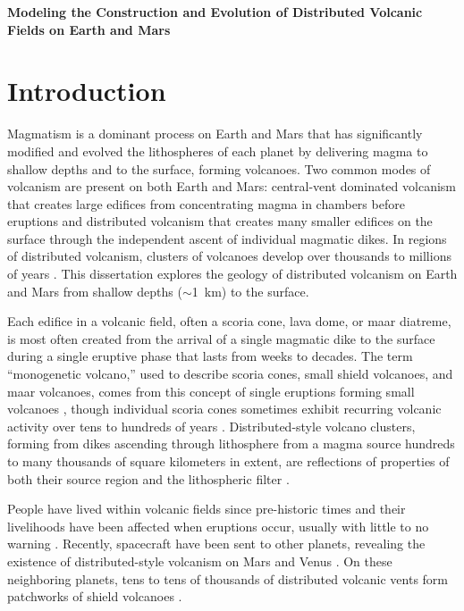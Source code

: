 \begin{center}
\textbf{Modeling the Construction and Evolution of Distributed Volcanic Fields on Earth and Mars}
\end{center}

\section*{Introduction}
Magmatism is a dominant process on Earth and Mars that has significantly modified and evolved the lithospheres of each planet by delivering magma to shallow depths and to the surface, forming volcanoes. Two common modes of volcanism are present on both Earth and Mars: central-vent dominated volcanism that creates large edifices from concentrating magma in chambers before eruptions and distributed volcanism that creates many smaller edifices on the surface through the independent ascent of individual magmatic dikes. In regions of distributed volcanism, clusters of volcanoes develop over thousands to millions of years \citep{valentine2000basaltic}. This dissertation explores the geology of distributed volcanism on Earth and Mars from shallow depths ($\sim$1~km) to the surface. 

Each edifice in a volcanic field, often a scoria cone, lava dome, or maar diatreme, is most often created from the arrival of a single magmatic dike to the surface during a single eruptive phase that lasts from weeks to decades. The term ``monogenetic volcano,'' used to describe scoria cones, small shield volcanoes, and maar volcanoes, comes from this concept of single eruptions forming small volcanoes \citep{greeley1977basaltic}, though individual scoria cones sometimes exhibit recurring volcanic activity over tens to hundreds of years \citep{hill1998cerro}. Distributed-style volcano clusters, forming from dikes ascending through lithosphere from a magma source hundreds to many thousands of square kilometers in extent, are reflections of properties of both their source region and the lithospheric filter \citep{settle1979structure}.

People have lived within volcanic fields since pre-historic times and their livelihoods have been affected when eruptions occur, usually with little to no warning \citep{elson2007living}. Recently, spacecraft have been sent to other planets, revealing the existence of distributed-style volcanism on Mars \citep{carr1977some} and Venus \citep{head1992venus}. On these neighboring planets, tens to tens of thousands of distributed volcanic vents form patchworks of shield volcanoes \citep{richardson2013volcanic,miller2012shield}. 

